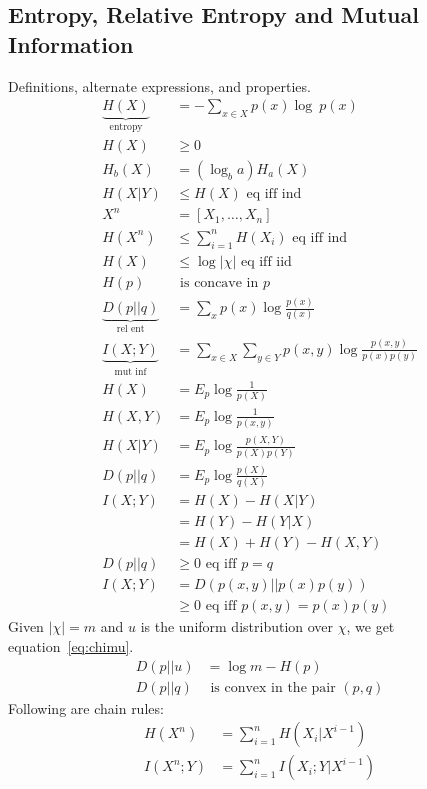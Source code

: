 \documentclass[10pt]{article}
\begin{document}
\begin{tiny}
\begin{multicols}{3}
\section*{Entropy, Relative Entropy and Mutual Information}
Definitions, alternate expressions, and properties.
\begin{align}
\underbrace{H(X)}_\text{entropy}&= -\sum_{x\in X} p(x) \log\ p(x) \label{eq:entropy}\\
H(X)& \geq 0\\
H_b(X)&= (\log_b a)H_a(X)\\
H(X|Y)& \leq  H(X)\text{ eq iff ind} \label{eq:conditioning}\\
X^n&=[X_1,\ldots,X_n]\\
H(X^n)& \leq \sum_{i=1}^n H(X_i)\text{ eq iff ind} \label{eq:jointsum}\\
H(X)&\leq  \log |\chi|  \text{ eq iff iid}\label{eq:alphabetentropy}\\
H(p)&\text{ is concave in $p$}\\
\underbrace{D(p||q)}_\text{rel ent} & = \sum_x p(x) \log \frac{p(x)}{q(x)}\\
\underbrace{I(X;Y)}_\text{mut inf} & = \sum_{x\in X} \sum_{y \in Y} p(x,y) \log \frac{p(x,y)}{p(x)p(y)}\\
H(X)&=E_p \log \frac{1}{p(X)}\\
H(X,Y)&=E_p\log \frac{1}{p(x,y)}\\
H(X|Y)&=E_p\log \frac{p(X,Y)}{p(X)p(Y)}\\
D(p||q)&=E_p\log \frac{p(X)}{q(X)}\\
I(X;Y)&=H(X)-H(X|Y)\\
&=H(Y)-H(Y|X)\\
&=H(X)+H(Y)-H(X,Y)\\
D(p||q)&\geq 0 \text{ eq iff $p=q$}\\
I(X;Y)&=D(p(x,y)||p(x)p(y))\\
	&\geq 0 \text{ eq iff $p(x,y)=p(x)p(y)$}
\end{align}
Given $|\chi|=m$ and $u$ is the uniform distribution over $\chi$, we get equation~\ref{eq:chimu}.
\begin{align}
D(p||u)&=\log m - H(p)\label{eq:chimu}\\
D(p||q)&\text{ is convex in the pair }(p,q)
\end{align}
Following are chain rules:
\begin{align}
H(X^n)&=\sum_{i=1}^n H(X_i|X^{i-1})\\
I(X^n;Y)&=\sum_{i=1}^n I(X_i;Y|X^{i-1})\\

\end{align}
\end{multicols}
\end{tiny}
\end{document}
